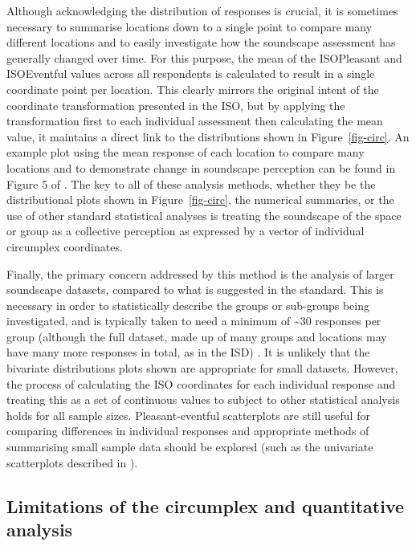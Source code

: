 \documentclass[
  authoryear,
  preprint,
  3p]{elsarticle}
\begin{document}
Although acknowledging the distribution of responses is crucial, it is
sometimes necessary to summarise locations down to a single point to
compare many different locations and to easily investigate how the
soundscape assessment has generally changed over time. For this purpose,
the mean of the ISOPleasant and ISOEventful values across all
respondents is calculated to result in a single coordinate point per
location. This clearly mirrors the original intent of the coordinate
transformation presented in the ISO, but by applying the transformation
first to each individual assessment then calculating the mean value, it
maintains a direct link to the distributions shown in
Figure~\ref{fig-circ}. An example plot using the mean response of each
location to compare many locations and to demonstrate change in
soundscape perception can be found in Figure 5 of
\citet{Mitchell2021Investigating}. The key to all of these analysis
methods, whether they be the distributional plots shown in
Figure~\ref{fig-circ}, the numerical summaries, or the use of other
standard statistical analyses is treating the soundscape of the space or
group as a collective perception as expressed by a vector of individual
circumplex coordinates.

Finally, the primary concern addressed by this method is the analysis of
larger soundscape datasets, compared to what is suggested in the
standard. This is necessary in order to statistically describe the
groups or sub-groups being investigated, and is typically taken to need
a minimum of \textasciitilde30 responses per group (although the full
dataset, made up of many groups and locations may have many more
responses in total, as in the ISD)
\citep[e.g.][]{Hong2015Influence, PuyanaRomero2016Modelling}. It is
unlikely that the bivariate distributions plots shown are appropriate
for small datasets. However, the process of calculating the ISO
coordinates for each individual response and treating this as a set of
continuous values to subject to other statistical analysis holds for all
sample sizes. Pleasant-eventful scatterplots are still useful for
comparing differences in individual responses and appropriate methods of
summarising small sample data should be explored (such as the univariate
scatterplots described in \citet{Weissgerber2015Bar}).

\hypertarget{limitations-of-the-circumplex-and-quantitative-analysis}{%
\subsection{Limitations of the circumplex and quantitative
analysis}\label{limitations-of-the-circumplex-and-quantitative-analysis}}
\end{document}
